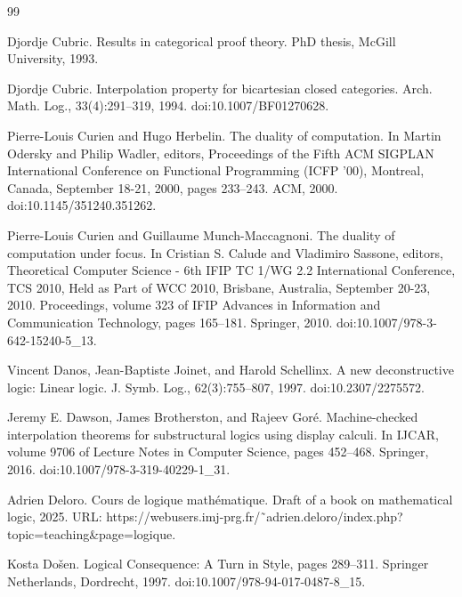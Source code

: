 \begin{thebibliography}{99}
\par\noindent    Djordje Cubric.  Results in categorical proof theory.  PhD thesis, McGill University, 1993.  

\par\noindent    Djordje Cubric.  Interpolation property for bicartesian closed categories.  Arch. Math. Log., 33(4):291–319, 1994.  doi:10.1007/BF01270628.  

\par\noindent    Pierre-Louis Curien and Hugo Herbelin.  The duality of computation.  In Martin Odersky and Philip Wadler, editors, Proceedings of the Fifth ACM SIGPLAN International Conference on Functional Programming (ICFP ’00), Montreal, Canada, September 18-21, 2000, pages 233–243. ACM, 2000.  doi:10.1145/351240.351262.  

\par\noindent    Pierre-Louis Curien and Guillaume Munch-Maccagnoni.  The duality of computation under focus.  In Cristian S. Calude and Vladimiro Sassone, editors, Theoretical Computer Science - 6th IFIP TC 1/WG 2.2 International Conference, TCS 2010, Held as Part of WCC 2010, Brisbane, Australia, September 20-23, 2010. Proceedings, volume 323 of IFIP Advances in Information and Communication Technology, pages 165–181. Springer, 2010.  doi:10.1007/978-3-642-15240-5\_13.  

\par\noindent    Vincent Danos, Jean-Baptiste Joinet, and Harold Schellinx.  A new deconstructive logic: Linear logic.  J. Symb. Log., 62(3):755–807, 1997.  doi:10.2307/2275572.  

\par\noindent    Jeremy E. Dawson, James Brotherston, and Rajeev Goré.  Machine-checked interpolation theorems for substructural logics using display calculi.  In IJCAR, volume 9706 of Lecture Notes in Computer Science, pages 452–468. Springer, 2016.  doi:10.1007/978-3-319-40229-1\_31.  

\par\noindent    Adrien Deloro.  Cours de logique mathématique.  Draft of a book on mathematical logic, 2025.  URL: https://webusers.imj-prg.fr/˜adrien.deloro/index.php?topic=teaching\&page=logique.  

\par\noindent    Kosta Došen.  Logical Consequence: A Turn in Style, pages 289–311.  Springer Netherlands, Dordrecht, 1997.  doi:10.1007/978-94-017-0487-8\_15.  


\end{thebibliography}
